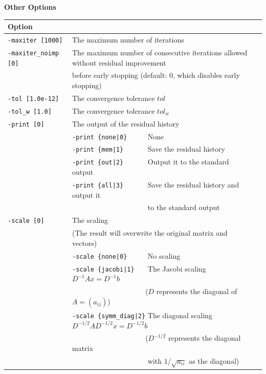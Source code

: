 \documentclass[a4paper]{article}
\begin{document}
\begin{minipage}[t]{\textwidth}
\begin{center}
{\bf Other Options}\\
\begin{tabular}{l|ll}\hline\hline
Option &                          \\ \hline
\verb=-maxiter [1000]= & The maximum number of iterations         \\
\verb=-maxiter_noimp [0]= & The maximum number of consecutive iterations allowed without residual improvement \\
                       & before early stopping (default: 0, which disables early stopping) \\
\verb=-tol [1.0e-12]=  & The convergence tolerance $tol$             \\
\verb=-tol_w [1.0]=    & The convergence tolerance $tol_w$  \\
\verb=-print [0]=      & The output of the residual history                \\
                       & \verb=-print {none|0}     =  None \\
                       & \verb=-print {mem|1}      =  Save the residual history\\
                       & \verb=-print {out|2}      =  Output it to the standard output\\
                       & \verb=-print {all|3}      =  Save the residual history and output it \\
                       & \verb=                    =  to the standard output\\
\verb=-scale [0]=      & The scaling \\
                       & (The result will overwrite the original matrix and vectors) \\
                       & \verb=-scale {none|0}     =  No scaling \\ 
                       & \verb=-scale {jacobi|1}   =  The Jacobi scaling $D^{-1}Ax=D^{-1}b$ \\
                       & \verb=                    =  ($D$ represents the diagonal of $A=(a_{ij})$)\\
                       & \verb=-scale {symm_diag|2}=  The diagonal scaling $D^{-1/2}AD^{-1/2}x=D^{-1/2}b$ \\
                       & \verb=                    =  ($D^{-1/2}$ represents the diagonal matrix \\
                       & \verb=                    =  with $1/\sqrt{a_{ii}}$ as the diagonal) \\ 

\end{tabular}
\end{center}
\end{minipage}
\end{document}
